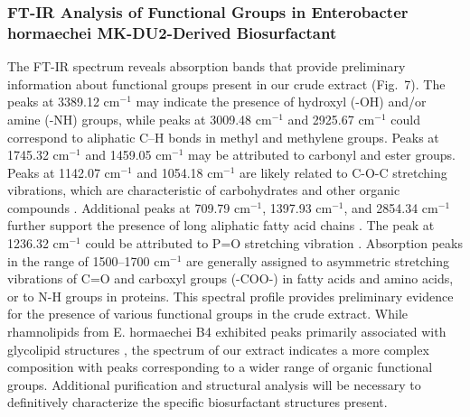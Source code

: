 \documentclass{svjour3}
\begin{document}
\subsubsection{FT-IR Analysis of Functional Groups in Enterobacter hormaechei MK-DU2-Derived Biosurfactant}
The FT-IR spectrum reveals absorption bands that provide preliminary information about functional groups present in our crude extract (Fig.~7). The peaks at 3389.12 cm$^{-1}$ may indicate the presence of hydroxyl (-OH) and/or amine (-NH) groups, while peaks at 3009.48 cm$^{-1}$ and 2925.67 cm$^{-1}$ could correspond to aliphatic C--H bonds in methyl and methylene groups. Peaks at 1745.32 cm$^{-1}$ and 1459.05 cm$^{-1}$ may be attributed to carbonyl and ester groups. Peaks at 1142.07 cm$^{-1}$ and 1054.18 cm$^{-1}$ are likely related to C-O-C stretching vibrations, which are characteristic of carbohydrates and other organic compounds \cite{57}. Additional peaks at 709.79 cm$^{-1}$, 1397.93 cm$^{-1}$, and 2854.34 cm$^{-1}$ further support the presence of long aliphatic fatty acid chains \cite{57}. The peak at 1236.32 cm$^{-1}$ could be attributed to P=O stretching vibration \cite{5}. Absorption peaks in the range of 1500--1700 cm$^{-1}$ are generally assigned to asymmetric stretching vibrations of C=O and carboxyl groups (-COO-) in fatty acids and amino acids, or to N-H groups in proteins.
This spectral profile provides preliminary evidence for the presence of various functional groups in the crude extract. While rhamnolipids from E. hormaechei B4 exhibited peaks primarily associated with glycolipid structures \cite{35}, the spectrum of our extract indicates a more complex composition with peaks corresponding to a wider range of organic functional groups. Additional purification and structural analysis will be necessary to definitively characterize the specific biosurfactant structures present.
\end{document}
